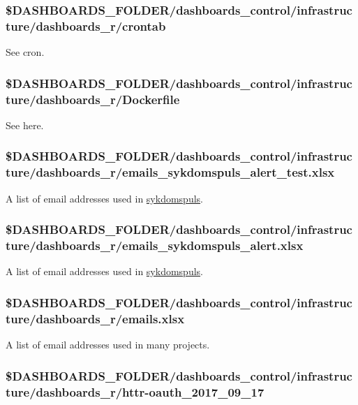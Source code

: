 \documentclass[12pt,]{article}
\begin{document}
\subsubsection{\$DASHBOARDS\_FOLDER/dashboards\_control/infrastructure/dashboards\_r/crontab}\label{dashboards_folderdashboards_controlinfrastructuredashboards_rcrontab}

See \protect\hypertarget{cron}{}{cron}.

\subsubsection{\$DASHBOARDS\_FOLDER/dashboards\_control/infrastructure/dashboards\_r/Dockerfile}\label{dashboards_folderdashboards_controlinfrastructuredashboards_rdockerfile}

See \protect\hypertarget{analysisdocker}{}{here}.

\subsubsection{\$DASHBOARDS\_FOLDER/dashboards\_control/infrastructure/dashboards\_r/emails\_sykdomspuls\_alert\_test.xlsx}\label{dashboards_folderdashboards_controlinfrastructuredashboards_remails_sykdomspuls_alert_test.xlsx}

A list of email addresses used in
\href{https://folkehelseinstituttet.github.io/dashboards_sykdomspuls/}{sykdomspuls}.

\subsubsection{\$DASHBOARDS\_FOLDER/dashboards\_control/infrastructure/dashboards\_r/emails\_sykdomspuls\_alert.xlsx}\label{dashboards_folderdashboards_controlinfrastructuredashboards_remails_sykdomspuls_alert.xlsx}

A list of email addresses used in
\href{https://folkehelseinstituttet.github.io/dashboards_sykdomspuls/}{sykdomspuls}.

\subsubsection{\$DASHBOARDS\_FOLDER/dashboards\_control/infrastructure/dashboards\_r/emails.xlsx}\label{dashboards_folderdashboards_controlinfrastructuredashboards_remails.xlsx}

A list of email addresses used in many projects.

\subsubsection{\$DASHBOARDS\_FOLDER/dashboards\_control/infrastructure/dashboards\_r/httr-oauth\_2017\_09\_17}\label{httroauth}
\end{document}
